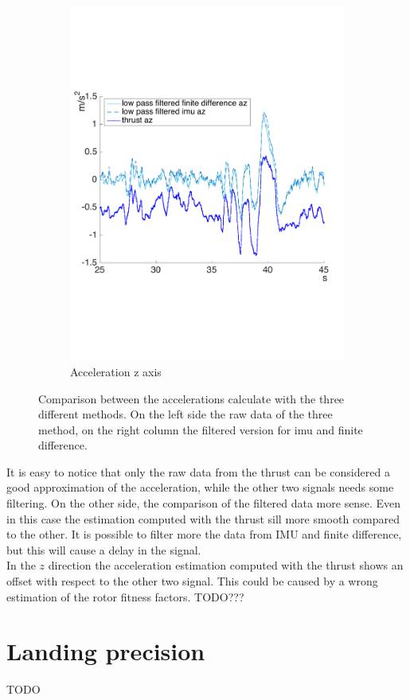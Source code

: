\begin{figure}[!htbp]
\begin{subfigure}[b]{0.45\textwidth}
     \includegraphics[width=\textwidth]{img/acc_z.pdf}
        \caption{Acceleration z axis}
        \label{fig:comparison_accz_fil}
   \end{subfigure}
    \caption{Comparison between the accelerations calculate with the three different methods. On the left side the raw data of the three method, on the right column the filtered version for imu and finite difference.}
    \label{fig:comparison_acc}
\end{figure}
It is easy to notice that only the raw data from the thrust can be considered a good approximation of the acceleration, while the other two signals needs some filtering. On the other side, the comparison of the filtered data more sense. Even in this case the estimation computed with the thrust sill more smooth compared to the other. It is possible to filter more the data from IMU and finite difference, but this will cause a delay in the signal.\\

In the $z$ direction the acceleration estimation computed with the thrust shows an offset with respect to the other two signal. This could be caused by a wrong estimation of the rotor fitness factors. TODO???

\section{Landing precision}
TODO



